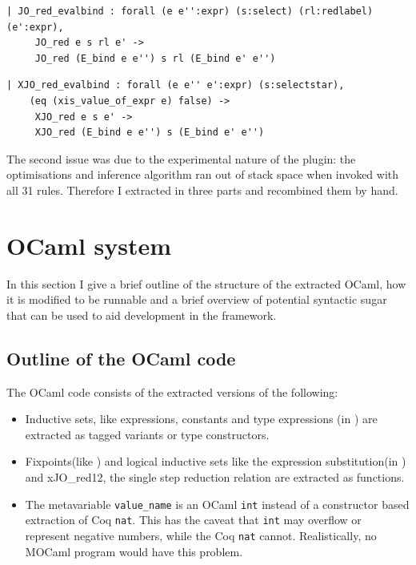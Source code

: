 \documentclass[12pt,twoside,notitlepage]{report}
\theoremstyle{plain}%
\theoremstyle{definition}
\theoremstyle{remark}
\begin{document}
\begin{minipage}{0.9\linewidth}

\begin{lstlisting}[language={Coq},caption={Coq reduction clause with unsafe assumption}, label={lst:coqredunsafe}]
| JO_red_evalbind : forall (e e'':expr) (s:select) (rl:redlabel) (e':expr),
     JO_red e s rl e' ->
     JO_red (E_bind e e'') s rl (E_bind e' e'')
\end{lstlisting}

\end{minipage}

\begin{minipage}{\linewidth}

\begin{lstlisting}[language={Coq},caption={Coq extractable reduction clause with safe assumption}, label={lst:coqxredsafe}]
 | XJO_red_evalbind : forall (e e'' e':expr) (s:selectstar),
    (eq (xis_value_of_expr e) false) ->
     XJO_red e s e' ->
     XJO_red (E_bind e e'') s (E_bind e' e'')
\end{lstlisting}

\end{minipage}


The second issue was due to the experimental nature of the plugin: the optimisations and inference algorithm ran out of stack space when invoked with all 31 rules. Therefore I extracted in three parts and recombined them by hand.

\section{OCaml system}
In this section I give a brief outline of the structure of the extracted OCaml, how it is modified to be runnable and a brief overview of potential syntactic sugar that can be used to aid development in the framework. 

\subsection{Outline of the OCaml code}
The OCaml code consists of the extracted versions of the following:
\begin{itemize}
\item{Inductive sets, like expressions, constants and type expressions (in ) are extracted as tagged variants or type constructors.}
\item{Fixpoints(like ) and logical inductive sets like the expression substitution(in ) and xJO\_red12, the single step reduction relation are extracted as functions.}
\item{The metavariable \verb|value_name| is an OCaml \lstinline|int| instead of a constructor based extraction of Coq \lstinline[language={Coq}]|nat|. This has the caveat that \lstinline|int| may overflow or represent negative numbers, while the Coq \lstinline[language={Coq}]|nat| cannot. Realistically, no MOCaml program would have this problem.}
\end{itemize}
\end{document}
